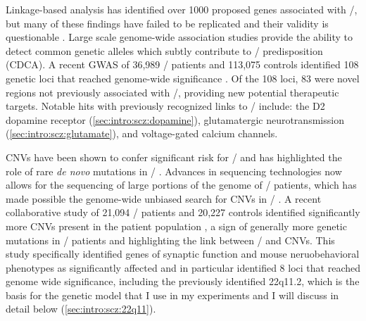 Linkage-based analysis has identified over 1000 proposed genes associated with \scz/, but many of these findings have failed to be replicated and their validity is questionable \citep[\url{http://www.szgene.org},][]{Allen2008}.
Large scale genome-wide association studies provide the ability to detect common genetic alleles which subtly contribute to \scz/ predisposition (CDCA).
A recent GWAS of 36,989 \scz/ patients and 113,075 controls identified 108 genetic loci that reached genome-wide significance \citep{Ripke2014}.
Of the 108 loci, 83 were novel regions not previously associated with \scz/, providing new potential therapeutic targets.
Notable hits with previously recognized links to \scz/ include: the D2 dopamine receptor (\autoref{sec:intro:scz:dopamine}), glutamatergic neurotransmission (\autoref{sec:intro:scz:glutamate}), and voltage-gated calcium channels.

\acs{CNVs} have been shown to confer significant risk for \scz/ and has highlighted the role of rare \emph{de novo} mutations in \scz/ \citep{Rodriguez-Murillo2012}.
Advances in sequencing technologies now allows for the sequencing of large portions of the genome of \scz/ patients, which has made possible the genome-wide unbiased search for \ac{CNVs} in \scz/ \citep{Xu2011}.
A recent collaborative study of 21,094 \scz/ patients and 20,227 controls identified significantly more \ac{CNVs} present in the patient population \citep{Marshall2016}, a sign of generally more genetic mutations in \scz/ patients and highlighting the link between \scz/ and \ac{CNVs}.
This study specifically identified genes of synaptic function and mouse neruobehavioral phenotypes as significantly affected and in particular identified 8 loci that reached genome wide significance, including the previously identified 22q11.2, which is the basis for the genetic model that I use in my experiments and I will discuss in detail below (\autoref{sec:intro:scz:22q11}).



